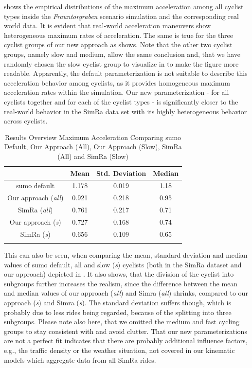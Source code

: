  shows the empirical distributions of the maximum acceleration among all cyclist types inside the \textit{Frauntorgraben} scenario simulation and the corresponding real world data.
It is evident that real-world acceleration maneuvers show heterogeneous maximum rates of acceleration.
The same is true for the three cyclist groups of our new approach as  shows.
Note that the other two cyclist groups, namely slow and medium, allow the same conclusion and, that we have randomly chosen the slow cyclist group to visualize in  to make the figure more readable.
Apparently, the default parameterization is not suitable to describe this acceleration behavior among cyclists, as it provides homogeneous maximum acceleration rates within the simulation.
Our new parameterization - for all cyclists together and for each of the cyclist types - is significantly closer to the real-world behavior in the SimRa data set with its highly heterogeneous behavior across cyclists.
\begin{table}
\centering
\caption{Results Overview Maximum Acceleration Comparing \ac{sumo} Default, Our Approach (All), Our Approach (Slow), SimRa (All) and SimRa (Slow)}%
\label{tab:results_overview_acc}
\begin{tabular}{cccc}
\toprule
& Mean & Std. Deviation & Median\\
\midrule
\midrule
\ac{sumo} default & \num{1.178} & \num{0.019} & \num{1.18} \\
\midrule
Our approach (\textit{all}) & \num{0.921} & \num{0.218} & \num{0.95} \\
SimRa (\textit{all}) & \num{0.761} & \num{0.217} & \num{0.71} \\
\midrule
Our approach (\textit{s}) & \num{0.727} & \num{0.168} & \num{0.74} \\
SimRa (\textit{s}) & \num{0.656} & \num{0.109} & \num{0.65} \\
\bottomrule&
\end{tabular}
\end{table}
This can also be seen, when comparing the mean, standard deviation and median values of \ac{sumo} default, all and slow (\textit{s}) cyclists (both in the SimRa dataset and our approach) depicted in .
It also shows, that the division of the cyclist into subgroups further increases the realism, since the difference between the mean and median values of our approach (\textit{all}) and Simra (\textit{all}) shrinks, compared to our approach (\textit{s}) and Simra (\textit{s}).
The standard deviation suffers though, which is probably due to less rides being regarded, because of the splitting into three subgroups.
Please note also here, that we omitted the medium and fast cycling groups to stay consistent with  and avoid clutter.
That our new parameterizations are not a perfect fit indicates that there are probably additional influence factors, e.g., the traffic density or the weather situation, not covered in our kinematic models which aggregate data from all SimRa rides.

